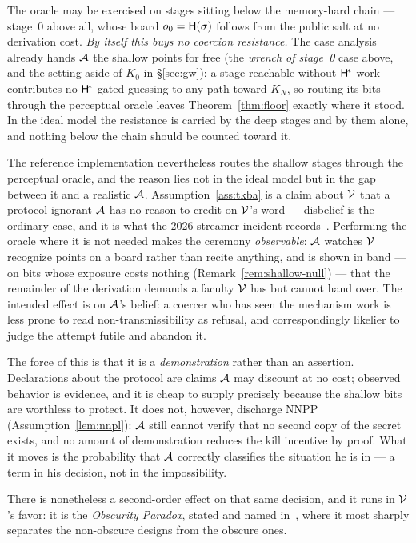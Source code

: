 \begin{remark}
\label{rem:shallow-null}
The oracle may be exercised on stages sitting below the memory-hard chain ---
stage~$0$ above all, whose board $o_0 = \mathsf{H}(\sigma)$ follows from the public
salt at no derivation cost. \emph{By itself this buys no coercion resistance.}
The case analysis already hands $\mathcal{A}$ the shallow points for free (the
\emph{wrench of stage~0} case above, and the setting-aside of $K_0$ in
\S\ref{sec:gw}): a stage reachable without $\mathsf{H}^{\!*}$ work contributes no
$\mathsf{H}^{\!*}$-gated guessing to any path toward $K_N$, so routing its bits through the
perceptual oracle leaves Theorem~\ref{thm:floor} exactly where it stood. In the
ideal model the resistance is carried by the deep stages and by them alone, and
nothing below the chain should be counted toward it.
\end{remark}

\begin{remark}
\label{rem:adversary-education}
The reference implementation nevertheless routes the shallow stages through the
perceptual oracle, and the reason lies not in the ideal model but in the gap
between it and a realistic $\mathcal{A}$. Assumption~\ref{ass:tkba} is a claim
about $\mathcal{V}$ that a protocol-ignorant $\mathcal{A}$ has no reason to credit on
$\mathcal{V}$'s word --- disbelief is the ordinary case, and it is what the
2026 streamer incident records~\cite{ratirl}. Performing the oracle where it is
not needed makes the ceremony \emph{observable}: $\mathcal{A}$ watches $\mathcal{V}$
recognize points on a board rather than recite anything, and is shown in band ---
on bits whose exposure costs nothing (Remark~\ref{rem:shallow-null}) --- that the
remainder of the derivation demands a faculty $\mathcal{V}$ has but cannot hand over.
The intended effect is on $\mathcal{A}$'s belief: a coercer who has seen the
mechanism work is less prone to read non-transmissibility as refusal, and
correspondingly likelier to judge the attempt futile and abandon it.

The force of this is that it is a \emph{demonstration} rather than an assertion.
Declarations about the protocol are claims $\mathcal{A}$ may discount at no cost;
observed behavior is evidence, and it is cheap to supply precisely because the
shallow bits are worthless to protect. It does not, however, discharge NNPP
(Assumption~\ref{lem:nnpl}): $\mathcal{A}$ still cannot verify that no second copy
of the secret exists, and no amount of demonstration reduces the kill incentive
by proof. What it moves is the probability that $\mathcal{A}$ correctly classifies
the situation he is in --- a term in his decision, not in the impossibility.

There is nonetheless a second-order effect on that same decision, and it runs in
$\mathcal{V}$'s favor: it is the \emph{Obscurity Paradox}, stated and named
in~\cite[\S3]{denial-spiral}, where it most sharply separates the
non-obscure designs from the obscure ones.
\end{remark}

